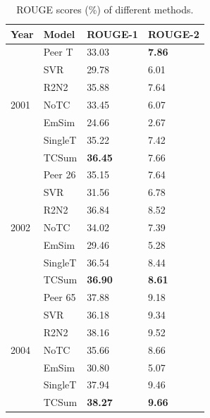 \documentclass[letterpaper]{article}
\begin{document}
\begin{table}[]
	\centering
	\small
	\begin{tabular}{l|lll}
		\hline
		Year                  & Model   & ROUGE-1 & ROUGE-2 \\ \hline
		\multirow{7}{*}{2001} & Peer T  & 33.03   & \textbf{7.86}    \\
		& SVR     & 29.78   & 6.01    \\
		& R2N2    & 35.88   & 7.64    \\ \cline{2-4}
		& NoTC    & 33.45   & 6.07    \\
		& EmSim   & 24.66   & 2.67    \\
		& SingleT & 35.22   & 7.42    \\
		& TCSum   & \textbf{36.45}   & 7.66    \\ \hline
		\multirow{7}{*}{2002} & Peer 26 & 35.15   & 7.64    \\
		& SVR     & 31.56   & 6.78    \\
		& R2N2    & 36.84   & 8.52    \\ \cline{2-4}
		& NoTC    & 34.02   & 7.39    \\
		& EmSim   & 29.46   & 5.28    \\
		& SingleT & 36.54   & 8.44    \\
		& TCSum   & \textbf{36.90}   & \textbf{8.61}    \\ \hline
		\multirow{7}{*}{2004} & Peer 65 & 37.88   & 9.18    \\
		& SVR     & 36.18   & 9.34    \\
		& R2N2    & 38.16   & 9.52    \\ \cline{2-4}
		& NoTC    & 35.66   & 8.66    \\
		& EmSim   & 30.80   & 5.07    \\
		& SingleT & 37.94   & 9.46    \\
		& TCSum   & \textbf{38.27}   & \textbf{9.66}    \\ \hline
	\end{tabular}
		\caption{ROUGE scores (\%) of different methods.}
		\label{tb:rouge}
\end{table}
\end{document}
